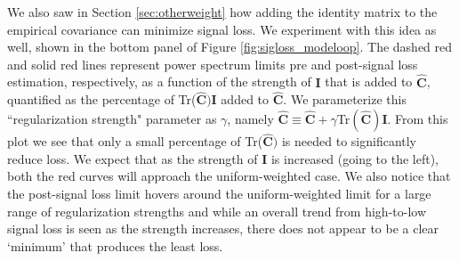 \documentclass[preprint2,numberedappendix,tighten]{aastex6}  %
\begin{document}
We also saw in Section \ref{sec:otherweight} how adding the identity matrix to the empirical covariance can minimize signal loss. We experiment with this idea as well, shown in the bottom panel of Figure \ref{fig:sigloss_modeloop}. The dashed red and solid red lines represent power spectrum limits pre and post-signal loss estimation, respectively, as a function of the strength of $\textbf{I}$ that is added to $\widehat{\textbf{C}}$, quantified as the percentage of Tr($\widehat{\textbf{C}})\textbf{I}$ added to $\widehat{\textbf{C}}$. We parameterize this ``regularization strength" parameter as $\gamma$, namely $\widehat{\textbf{C}} \equiv \widehat{\textbf{C}} + \gamma$Tr$(\widehat{\textbf{C}})\textbf{I}$. From this plot we see that only a small percentage of Tr($\widehat{\textbf{C}})$ is needed to significantly reduce loss. We expect that as the strength of $\textbf{I}$ is increased (going to the left), both the red curves will approach the uniform-weighted case. We also notice that the post-signal loss limit hovers around the uniform-weighted limit for a large range of regularization strengths and while an overall trend from high-to-low signal loss is seen as the strength increases, there does not appear to be a clear `minimum' that produces the least loss.
\end{document}
